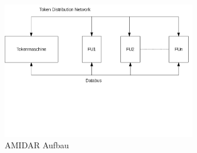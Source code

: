 \begin{figure}[h]
\centering
\includegraphics[width=0.75\textwidth]{Graphics/AMIDAR.png}
\caption{AMIDAR Aufbau}
\end{figure}
